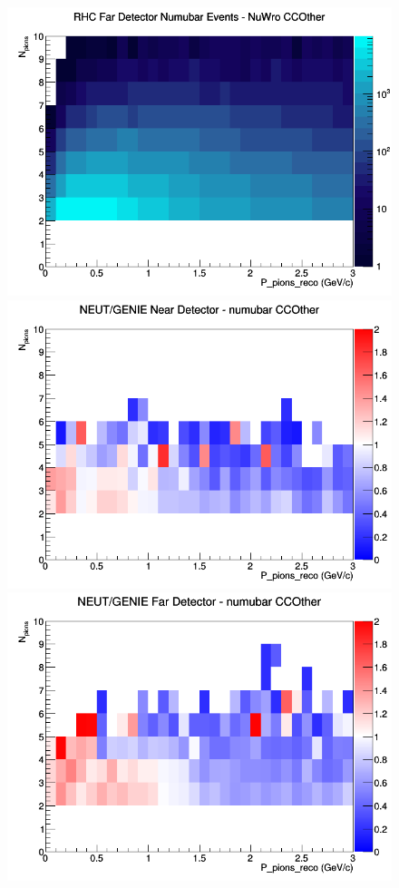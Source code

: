 \documentclass[12pt]{article}
\begin{document}
\begin{figure}[h]
\endminipage
{}
\includegraphics[width=\linewidth]{eff_N_P/GAr/pions/CCOther_RHC_FD_numubar_N_P_NuWro.png}
\endminipage
\newline
{}
\includegraphics[width=\linewidth]{eff_N_P/GAr/pions/ratios/CCOther_NEUT_GENIE_numubar_near_N_P.png}
\endminipage
{}
\includegraphics[width=\linewidth]{eff_N_P/GAr/pions/ratios/CCOther_NEUT_GENIE_numubar_far_N_P.png}

\end{figure}
\end{document}
